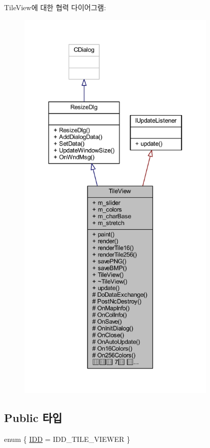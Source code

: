 Tile\+View에 대한 협력 다이어그램\+:\nopagebreak
\begin{figure}[H]
\begin{center}
\leavevmode
\includegraphics[height=550pt]{class_tile_view__coll__graph}
\end{center}
\end{figure}
\subsection*{Public 타입}
\begin{DoxyCompactItemize}
\item 
enum \{ \mbox{\hyperlink{class_tile_view_a845736b4060c250e1714163c078d1bc3a890e8d0680375a9b21dea40f16c9a8aa}{I\+DD}} = I\+D\+D\+\_\+\+T\+I\+L\+E\+\_\+\+V\+I\+E\+W\+ER
 \}
\end{DoxyCompactItemize}
